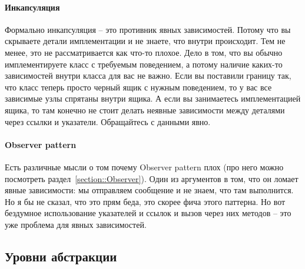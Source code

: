 \paragraph{Инкапсуляция}

Формально инкапсуляция -- это противник явных зависимостей.
Потому что вы скрываете детали имплементации и не знаете, что внутри происходит.
Тем не менее, это не рассматривается как что-то плохое.
Дело в том, что вы обычно имплементируете класс с требуемым поведением, а потому наличие каких-то зависимостей внутри класса для вас не важно.
Если вы поставили границу так, что класс теперь просто черный ящик с нужным поведением, то у вас все зависимые узлы спрятаны внутри ящика.
А если вы занимаетесь имплементацией ящика, то там конечно не стоит делать неявные зависимости между деталями через ссылки и указатели.
Обращайтесь с данными явно.

\paragraph{Observer pattern}

Есть различные мысли о том почему Observer pattern плох (про него можно посмотреть раздел~\ref{section::Observer}).
Один из аргументов в том, что он ломает явные зависимости: мы отправляем сообщение и не знаем, что там выполнится.
Но я бы не сказал, что это прям беда, это скорее фича этого паттерна.
Но вот бездумное использование указателей и ссылок и вызов через них методов -- это уже проблема для явных зависимостей.

\subsection{Уровни абстракции}
\label{section::AbstractionLevels}

